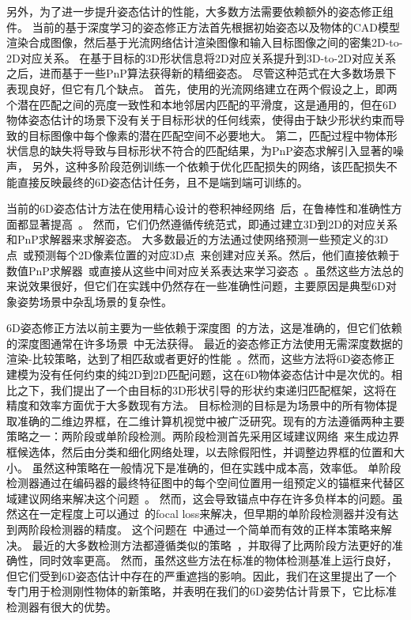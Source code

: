 \documentclass[12pt]{article}
\begin{document}
另外，为了进一步提升姿态估计的性能，大多数方法需要依赖额外的姿态修正组件。
当前的基于深度学习的姿态修正方法首先根据初始姿态以及物体的CAD模型渲染合成图像，然后基于光流网络估计渲染图像和输入目标图像之间的密集2D-to-2D对应关系。
在基于目标的3D形状信息将2D对应关系提升到3D-to-2D对应关系之后，进而基于一些PnP算法获得新的精细姿态。
尽管这种范式在大多数场景下表现良好，但它有几个缺点。
首先，使用的光流网络建立在两个假设之上，即两个潜在匹配之间的亮度一致性和本地邻居内匹配的平滑度，这是通用的，但在6D物体姿态估计的场景下没有关于目标形状的任何线索，使得由于缺少形状约束而导致的目标图像中每个像素的潜在匹配空间不必要地大。
第二，匹配过程中物体形状信息的缺失将导致与目标形状不符合的匹配结果，为PnP姿态求解引入显著的噪声，
另外，这种多阶段范例训练一个依赖于优化匹配损失的网络，该匹配损失不能直接反映最终的6D姿态估计任务，且不是端到端可训练的。

当前的6D姿态估计方法在使用精心设计的卷积神经网络~\cite{he2016resnet, resnext_2017_cvpr}后，在鲁棒性和准确性方面都显著提高~\cite{Xiang2018, peng2019pvnet, wang2019densefusion60}。
然而，它们仍然遵循传统范式，即通过建立3D到2D的对应关系和PnP求解器来求解姿态。
大多数最近的方法通过使网络预测一些预定义的3D点~\cite{rad2017bb8,hu2019segDriven,peng2019pvnet,Hu2021}或预测每个2D像素位置的对应3D点~\cite{zakharov2019dpod,Su2022,li2019cdpn,wang2021gdrnet,Di2021}来创建对应关系。然后，他们直接依赖于数值PnP求解器~\cite{lepetit2009epnp}或直接从这些中间对应关系表达来学习姿态~\cite{hu2020singleStage, EroPnP,wang2021gdrnet, Di2021}。虽然这些方法总的来说效果很好，但它们在实践中仍然存在一些准确性问题，主要原因是典型6D对象姿势场景中杂乱场景的复杂性。

6D姿态修正方法以前主要为一些依赖于深度图~\cite{Xiang2018, li2019cdpn, wang2019densefusion60}的方法，这是准确的，但它们依赖的深度图通常在许多场景~\cite{Hu2021}中无法获得。
最近的姿态修正方法使用无需深度数据的渲染-比较策略，达到了相匹敌或者更好的性能~\cite{li2018deepim, zakharov2019dpod, cosypose, rad2017bb8, Hu2022, Lipson2022, RNNPose_2022_cvpr,Repose_2021_iccv}。然而，这些方法将6D姿态修正建模为没有任何约束的纯2D到2D匹配问题，这在6D物体姿态估计中是次优的。相比之下，我们提出了一个由目标的3D形状引导的形状约束递归匹配框架，这将在精度和效率方面优于大多数现有方法。
目标检测的目标是为场景中的所有物体提取准确的二维边界框，在二维计算机视觉中被广泛研究。现有的方法遵循两种主要策略之一：两阶段或单阶段检测。两阶段检测首先采用区域建议网络~\cite{faster-rcnn, maskrcnn}来生成边界框候选体，然后由分类和细化网络处理，以去除假阳性，并调整边界框的位置和大小。
虽然这种策略在一般情况下是准确的，但在实践中成本高，效率低。
单阶段检测器通过在编码器的最终特征图中的每个空间位置用一组预定义的锚框来代替区域建议网络来解决这个问题~\cite{retinanet,fcosv1,yolov1}。 然而，这会导致锚点中存在许多负样本的问题。虽然这在一定程度上可以通过~\cite{retinanet,fpn}的focal
 loss来解决，但早期的单阶段检测器并没有达到两阶段检测器的精度。
这个问题在~\cite{ATSS}中通过一个简单而有效的正样本策略来解决。
最近的大多数检测方法都遵循类似的策略~\cite{fcosv2, PAA, autoassign, OTA, TTF, yolov3}，并取得了比两阶段方法更好的准确性，同时效率更高。
然而，虽然这些方法在标准的物体检测基准上运行良好，但它们受到6D姿态估计中存在的严重遮挡的影响。因此，我们在这里提出了一个专门用于检测刚性物体的新策略，并表明在我们的6D姿势估计背景下，它比标准检测器有很大的优势。
\end{document}
